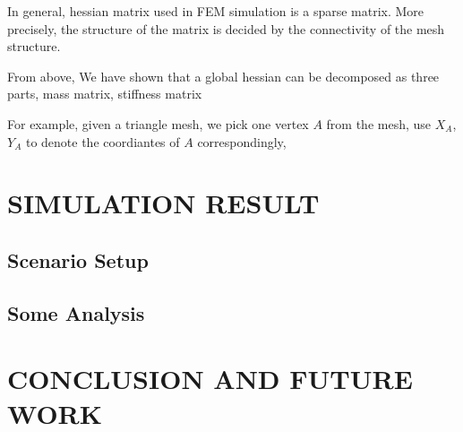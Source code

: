 \documentclass[
	11pt, 
	a4paper, 
	oneside,  
	final, 
]{report}
\begin{document}
In general, hessian matrix used in FEM simulation is a sparse matrix. More precisely, the structure of the matrix is decided by the connectivity of the mesh structure.

From above, We have shown that a global hessian can be decomposed as three parts, mass matrix, stiffness matrix

For example, given a triangle mesh, we pick one vertex $A$ from the mesh, use $X_A$, $Y_A$ to denote the coordiantes of $A$ correspondingly, 

\chapter{SIMULATION RESULT}
\section{Scenario Setup}
\section{Some Analysis}
\chapter{CONCLUSION AND FUTURE WORK}




\end{document}
